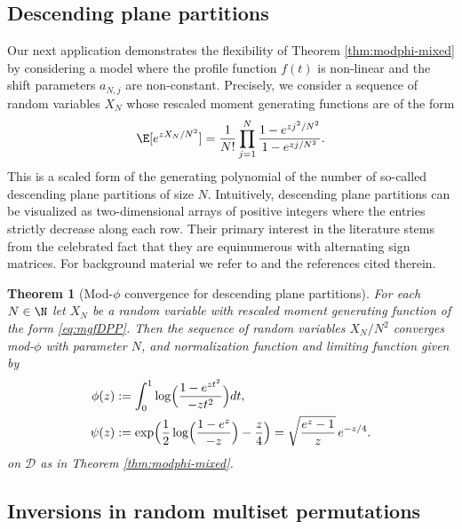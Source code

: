 \documentclass[11pt,a4paper]{scrartcl}
\numberwithin{equation}{section}
\theoremstyle{plain}
\newtheorem{theorem}{Theorem}[section]
\theoremstyle{definition}
\theoremstyle{remark}
\begin{document}
\subsection{Descending plane partitions}

Our next application demonstrates the flexibility of Theorem \ref{thm:modphi-mixed} by considering a model where the profile function $f(t)$ is non-linear and the shift parameters $a_{N,j}$ are non-constant. Precisely, we consider a sequence of random variables $X_N$ whose rescaled moment generating functions are of the form
\begin{equation}\label{eq:mgfDPP}
\E[e^{zX_N/N^2}] = \frac{1}{N!} \prod_{j=1}^N \frac{1-e^{zj^2/N^2}}{1-e^{zj/N^2}}.
\end{equation}
This is a scaled form of the generating polynomial of the number of so-called descending plane partitions of size $N$. Intuitively, descending plane partitions can be visualized as two-dimensional arrays of positive integers where the entries strictly decrease along each row. Their primary interest in the literature stems from the celebrated fact that they are equinumerous with alternating sign matrices. For background material we refer to \cite[Section 4.3.4]{heerten2024probabilistic} and the references cited therein.

\begin{theorem}[Mod-$\phi$ convergence for descending plane partitions]\label{thm: mod_phi_j_squared}
	For each $N\in\N$ let $X_N$ be a random variable with rescaled moment generating function of the form \eqref{eq:mgfDPP}. Then the sequence of random variables $X_N/N^2$ converges mod-$\phi$ with parameter $N$, and normalization function and limiting function given by
	\begin{align*}
	\phi(z) &:= \int_0^1\log\Bigl(\frac{1-e^{zt^2}}{-zt^2}\Bigr) dt, \\
	\psi(z) &:= \exp\Bigl( \frac{1}{2}\log\Bigl(\frac{1-e^{z}}{-z}\Bigr) - \frac{z}{4} \Bigr) = \sqrt{\frac{e^z-1}{z}}\, e^{-z/4}.
	\end{align*}
	on $\mathscr{D}$ as in Theorem \ref{thm:modphi-mixed}. 
\end{theorem}

\subsection{Inversions in random multiset permutations}
\end{document}
